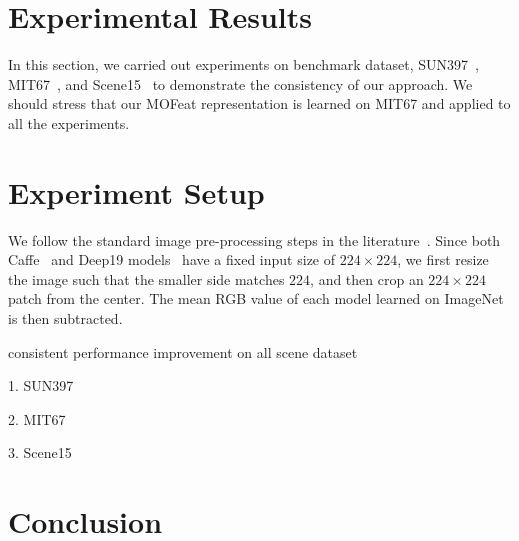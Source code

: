 \documentclass[10pt,twocolumn,letterpaper]{article}
\begin{document}
\section{Experimental Results\label{sec:exp}}

In this section, we carried out experiments on benchmark dataset, SUN397~\cite{SUN397}, MIT67~\cite{MIT67}, and Scene15~\cite{Scene15} to demonstrate the consistency of our approach. We should stress that our MOFeat representation is learned on MIT67 and applied to all the experiments.

\section{Experiment Setup}

We follow the standard image pre-processing steps in the literature~\cite{AlexNet,Caffe,veryDeep}. Since both Caffe~\cite{Caffe} and Deep19 models~\cite{veryDeep} have a fixed input size of $224\times 224$, we first resize the image such that the smaller side matches $224$, and then crop an $224\times 224$ patch from the center. The mean RGB value of each model learned on ImageNet~\cite{ImageNet} is then subtracted.  


consistent performance improvement on all scene dataset

1. SUN397

2. MIT67

3. Scene15

\section{Conclusion}




{\small


}
\end{document}
